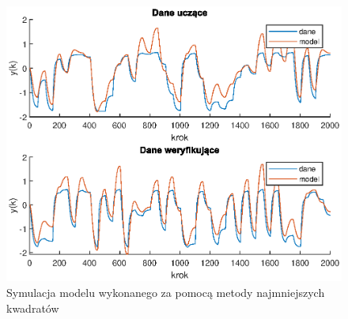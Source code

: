 		\begin{figure}[h!]
			\centering
			\includegraphics[width=\linewidth]{img/mnk.eps}
			\caption{Symulacja modelu wykonanego za pomocą metody najmniejszych kwadratów}
			\label{fig:mnk}
		\end{figure}